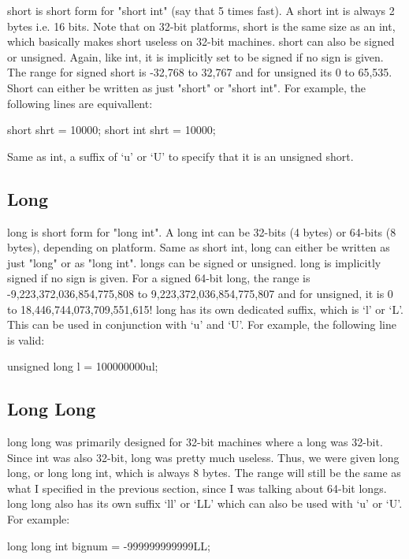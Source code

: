 \documentclass{article}
\begin{document}
short is short form for "short int" (say that 5 times fast). A short int is always 2 bytes i.e. 16 bits. Note
that on 32-bit platforms, short is the same size as an int, which basically makes short useless on 32-bit
machines. short can also be signed or unsigned. Again, like int, it is implicitly set to be signed if no sign
is given. The range for signed short is -32,768 to 32,767 and for unsigned its 0 to 65,535. Short can either
be written as just "short" or "short int". For example, the following lines are equivallent:

\begin{clst}
short shrt = 10000;
short int shrt = 10000;
\end{clst}

Same as int, a suffix of ‘u’ or ‘U’ to specify that it is an unsigned short.

\subsection{Long}

long is short form for "long int". A long int can be 32-bits (4 bytes) or 64-bits (8 bytes), depending on
platform. Same as short int, long can either be written as just "long" or as "long int". longs can be signed
or unsigned. long is implicitly signed if no sign is given. For a signed 64-bit long, the range is
-9,223,372,036,854,775,808 to 9,223,372,036,854,775,807 and for unsigned, it is 0 to 18,446,744,073,709,551,615!
long has its own dedicated suffix, which is ‘l’ or ‘L’. This can be used in conjunction with ‘u’ and ‘U’. For
example, the following line is valid:

\begin{clst}
unsigned long l = 100000000ul;
\end{clst}

\subsection{Long Long}

long long was primarily designed for 32-bit machines where a long was 32-bit. Since int was also 32-bit, long
was pretty much useless. Thus, we were given long long, or long long int, which is always 8 bytes. The range
will still be the same as what I specified in the previous section, since I was talking about 64-bit longs.
long long also has its own suffix ‘ll’ or ‘LL’ which can also be used with ‘u’ or ‘U’. For example:

\begin{clst}
long long int bignum = -999999999999LL;
\end{clst}
\end{document}
